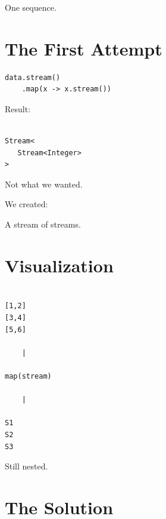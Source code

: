 \documentclass[11pt,a4paper]{book}
\begin{document}

One sequence.


\section{The First Attempt}

\begin{verbatim} 
data.stream()
    .map(x -> x.stream())
\end{verbatim}


Result:

\begin{verbatim}

Stream<
   Stream<Integer>
>

\end{verbatim}


Not what we wanted.


We created:


A stream of streams.


\section{Visualization}

\begin{verbatim}

[1,2]
[3,4]
[5,6]

    |

map(stream)

    |

S1
S2
S3

\end{verbatim}


Still nested.


\section{The Solution}
\end{document}
